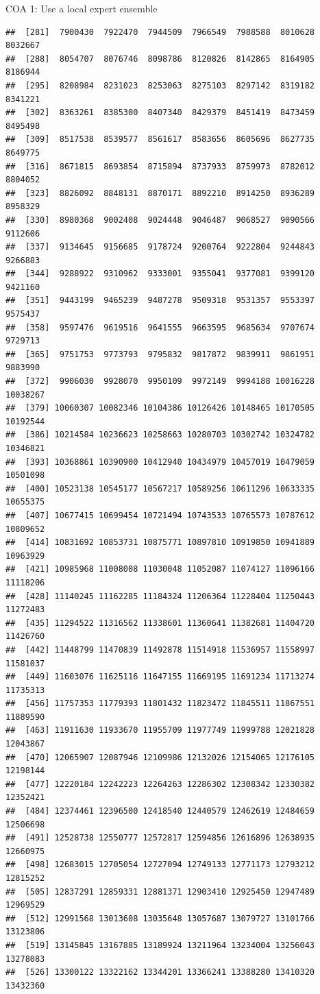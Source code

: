 \documentclass[ignorenonframetext,]{beamer}
\begin{document}
\begin{frame}[fragile]{COA 1: Use a local expert ensemble}
\begin{verbatim}
##  [281]  7900430  7922470  7944509  7966549  7988588  8010628  8032667
##  [288]  8054707  8076746  8098786  8120826  8142865  8164905  8186944
##  [295]  8208984  8231023  8253063  8275103  8297142  8319182  8341221
##  [302]  8363261  8385300  8407340  8429379  8451419  8473459  8495498
##  [309]  8517538  8539577  8561617  8583656  8605696  8627735  8649775
##  [316]  8671815  8693854  8715894  8737933  8759973  8782012  8804052
##  [323]  8826092  8848131  8870171  8892210  8914250  8936289  8958329
##  [330]  8980368  9002408  9024448  9046487  9068527  9090566  9112606
##  [337]  9134645  9156685  9178724  9200764  9222804  9244843  9266883
##  [344]  9288922  9310962  9333001  9355041  9377081  9399120  9421160
##  [351]  9443199  9465239  9487278  9509318  9531357  9553397  9575437
##  [358]  9597476  9619516  9641555  9663595  9685634  9707674  9729713
##  [365]  9751753  9773793  9795832  9817872  9839911  9861951  9883990
##  [372]  9906030  9928070  9950109  9972149  9994188 10016228 10038267
##  [379] 10060307 10082346 10104386 10126426 10148465 10170505 10192544
##  [386] 10214584 10236623 10258663 10280703 10302742 10324782 10346821
##  [393] 10368861 10390900 10412940 10434979 10457019 10479059 10501098
##  [400] 10523138 10545177 10567217 10589256 10611296 10633335 10655375
##  [407] 10677415 10699454 10721494 10743533 10765573 10787612 10809652
##  [414] 10831692 10853731 10875771 10897810 10919850 10941889 10963929
##  [421] 10985968 11008008 11030048 11052087 11074127 11096166 11118206
##  [428] 11140245 11162285 11184324 11206364 11228404 11250443 11272483
##  [435] 11294522 11316562 11338601 11360641 11382681 11404720 11426760
##  [442] 11448799 11470839 11492878 11514918 11536957 11558997 11581037
##  [449] 11603076 11625116 11647155 11669195 11691234 11713274 11735313
##  [456] 11757353 11779393 11801432 11823472 11845511 11867551 11889590
##  [463] 11911630 11933670 11955709 11977749 11999788 12021828 12043867
##  [470] 12065907 12087946 12109986 12132026 12154065 12176105 12198144
##  [477] 12220184 12242223 12264263 12286302 12308342 12330382 12352421
##  [484] 12374461 12396500 12418540 12440579 12462619 12484659 12506698
##  [491] 12528738 12550777 12572817 12594856 12616896 12638935 12660975
##  [498] 12683015 12705054 12727094 12749133 12771173 12793212 12815252
##  [505] 12837291 12859331 12881371 12903410 12925450 12947489 12969529
##  [512] 12991568 13013608 13035648 13057687 13079727 13101766 13123806
##  [519] 13145845 13167885 13189924 13211964 13234004 13256043 13278083
##  [526] 13300122 13322162 13344201 13366241 13388280 13410320 13432360

\end{verbatim}
\end{frame}
\end{document}
